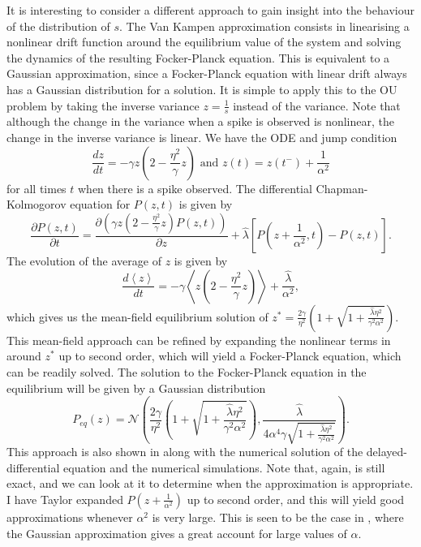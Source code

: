 It is interesting to consider a different approach to gain insight into the behaviour of the distribution of $s$. The Van Kampen approximation consists in linearising
a nonlinear drift function around the equilibrium value of the system and solving the dynamics of the resulting Focker-Planck equation. This is
equivalent to a Gaussian approximation, since a Focker-Planck equation with linear drift always has a Gaussian distribution for a solution. It is simple to apply this
to the OU problem by taking the inverse variance $z= \frac{1}{s}$ instead of the variance.
Note that although the change in the variance when a spike 
is observed is nonlinear, the change in the inverse variance is linear. We have the ODE and jump condition
\[
\frac{dz}{dt} = -\gamma z \left(2- \frac{\eta^2}{\gamma}z\right) \textrm{ and } z(t) = z(t^- ) + \frac{1}{\alpha^2}
\]
for all times $t$ when there is a spike observed. The differential Chapman-Kolmogorov equation for $P(z,t)$ is given by
\begin{equation}
\label{eq:DCKE_Z}
\frac{\partial P(z,t)}{\partial t} = \frac{\partial \left( \gamma z \left(2- \frac{\eta^2}{\gamma}z\right) P(z,t)\right)}{\partial z} + 
\hat{\lambda}\left[ P(z+\frac{1}{\alpha^2},t) - P(z,t)\right].
\end{equation}
The evolution of the average of $z$ is given by
\[
\frac{d\left<z\right>}{dt} = -\gamma\left< z \left(2- \frac{\eta^2}{\gamma}z\right)\right> + \frac{\hat{\lambda}}{\alpha^2},
\]
which gives us the mean-field equilibrium solution of $z^* = \frac{2\gamma}{\eta^2}\left(1+\sqrt{1+\frac{\hat{\lambda} \eta^2}{\gamma^2 \alpha^2}}\right)$. This 
mean-field
approach can be refined by expanding the nonlinear terms in  around $z^*$ up to second order, which will yield a Focker-Planck equation, which can
be readily solved. The solution to the Focker-Planck equation in the equilibrium will be given by a Gaussian distribution
\[
P_{eq}(z) = \mathcal{N}\left(\frac{2\gamma}{\eta^2}\left(1+\sqrt{1+\frac{\hat{\lambda} \eta^2}{\gamma^2 \alpha^2}}\right), 
\frac{ \hat{\lambda} }{4\alpha^4\gamma \sqrt{1+\frac{\hat{\lambda}\eta^2}{\gamma^2 \alpha^2} }}\right).
\]
This approach is also shown in  along with the numerical solution of the delayed-differential equation and the numerical simulations. 
Note that, again,  is still exact, and we can look at it to determine when the approximation is appropriate. I have Taylor expanded 
$P(z+\frac{1}{\alpha^2})$ up to second order, and this will yield good approximations whenever $\alpha^2$ is very large. This is seen to be the case in 
, where the Gaussian approximation gives a great account for large values of $\alpha$.

